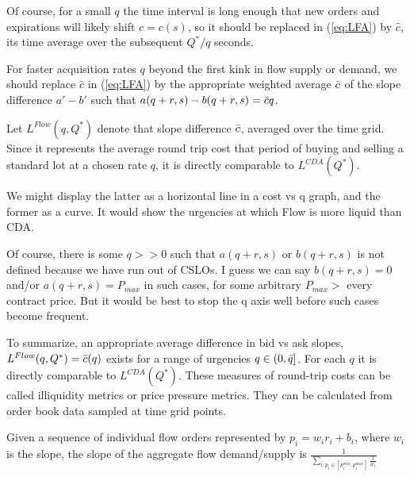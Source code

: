 \begin{singlespace}
Of course, for a small $q$ the time interval is long enough that new orders and expirations will likely shift $c=c(s)$, so it should be replaced in (\ref{eq:LFA}) by $\hat{c}$, its time average  over the subsequent 
$Q^*/q$ seconds.

For faster acquisition rates $q$ 
beyond the first kink in flow supply or demand, 
we should replace $\hat{c}$ in 
(\ref{eq:LFA}) by the appropriate weighted average $\Bar{c}$ of the slope difference $a' - b'$
such that $a(q+r,s) - b(q+r,s) = \Bar{c} q $.

Let $L^{Flow}(q,Q^*)$ denote that slope difference $\Bar{c}$, averaged over the time grid.
Since it represents the average round trip cost that period
of buying and selling a standard lot at a chosen rate $q$,
it is directly comparable to $L^{CDA}(Q^*)$.

We might display the latter as a horizontal line in a cost vs q graph, and the former as a curve. It would show the
urgencies at which Flow is more liquid than CDA.

Of course, there is some $q>>0$ such that 
$a(q+r,s) \mbox{ or } b(q+r,s)$ is not defined because we have run out of CSLOs. I guess we can say $ b(q+r,s) =0$ and/or $ a(q+r,s) =P_{max}$ in such cases, for some arbitrary $P_{max}>$ every contract price. 
But it would be best to stop the q axis well before such cases become frequent.

To summarize, an appropriate average difference in bid vs ask slopes,
$L^{Flow}(q,Q^*) = \Bar{c}(q)$ exists for a range of urgencies $q \in (0, \Bar{q}]$. 
For each $q$ it is directly comparable to $L^{CDA}(Q^*)$. 
These measures of round-trip costs can be called illiquidity metrics or price pressure metrics. 
They can be calculated from order book data sampled at time grid points.


Given a sequence of individual flow orders represented by $p_i = w_i r_i + b_i$, where
 $w_i$ is the slope, the slope of the aggregate flow demand/supply is $\frac{1}{\sum_{i: p_t \in \left[p^{min}_i, p^{max}_i\right]} \frac{1}{w_i}}$






\end{singlespace}




